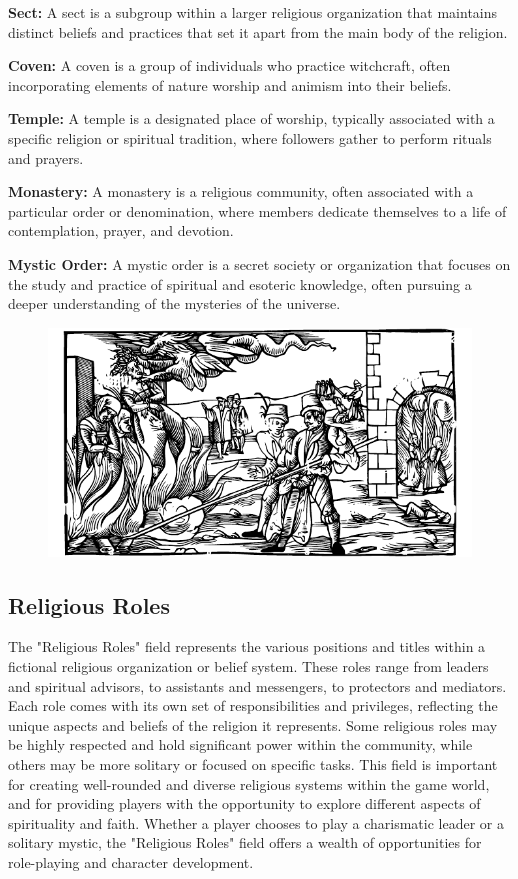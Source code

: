 \documentclass[12pt]{book}  %
\begin{document}
\textbf{Sect:} A sect is a subgroup within a larger religious organization that maintains distinct beliefs and practices that set it apart from the main body of the religion.

\textbf{Coven:} A coven is a group of individuals who practice witchcraft, often incorporating elements of nature worship and animism into their beliefs.

\textbf{Temple:} A temple is a designated place of worship, typically associated with a specific religion or spiritual tradition, where followers gather to perform rituals and prayers.

\textbf{Monastery:} A monastery is a religious community, often associated with a particular order or denomination, where members dedicate themselves to a life of contemplation, prayer, and devotion.

\textbf{Mystic Order:} A mystic order is a secret society or organization that focuses on the study and practice of spiritual and esoteric knowledge, often pursuing a deeper understanding of the mysteries of the universe.

\begin{figure}[h]
    \centering
    \includegraphics[width=\textwidth]{./images/religion04.pdf}
\end{figure}

\subsection{\textbf{Religious Roles}}

The "Religious Roles" field represents the various positions and titles within a fictional religious organization or belief system. These roles range from leaders and spiritual advisors, to assistants and messengers, to protectors and mediators. Each role comes with its own set of responsibilities and privileges, reflecting the unique aspects and beliefs of the religion it represents. Some religious roles may be highly respected and hold significant power within the community, while others may be more solitary or focused on specific tasks. This field is important for creating well-rounded and diverse religious systems within the game world, and for providing players with the opportunity to explore different aspects of spirituality and faith. Whether a player chooses to play a charismatic leader or a solitary mystic, the "Religious Roles" field offers a wealth of opportunities for role-playing and character development.
\end{document}
